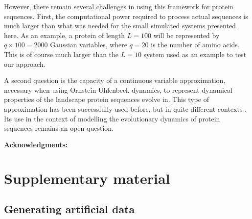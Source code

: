 \documentclass[preprint,amsmath,amssymb,superscriptaddress,showpacs,pre]{revtex4-1}
\begin{document}
However, there remain several challenges in using this framework for protein sequences. 
First, the computational power required to process actual sequences is much larger than what was needed for the small simulated systems presented here. 
As an example, a protein of length $L=100$ will be represented by $q\times 100=2000$ Gaussian variables, where $q=20$ is the number of amino acids. 
This is of course much larger than the $L=10$ system used as an example to test our approach. 

A second question is the capacity of a continuous variable approximation, necessary when using Ornstein-Uhlenbeck dynamics, to represent dynamical properties of the landscape protein sequences evolve in. 
This type of approximation has been successfully used before, but in quite different contexts \cite{jones_psicov_2012,barton_large_2014,baldassi_fast_2014}. 
Its use in the context of modelling the evolutionary dynamics of protein sequences remains an open question. 


\textbf{Acknowledgments:} 





\clearpage




\newpage
\appendix
\setcounter{figure}{0}
\renewcommand{\figurename}{Figure S}
\setcounter{table}{0}
\renewcommand{\tablename}{Table S}

\section{Supplementary material} %
\label{sec:supplementary_material}


\subsection{Generating artificial data} %
\label{sub:generating_artificial_data}
\end{document}
